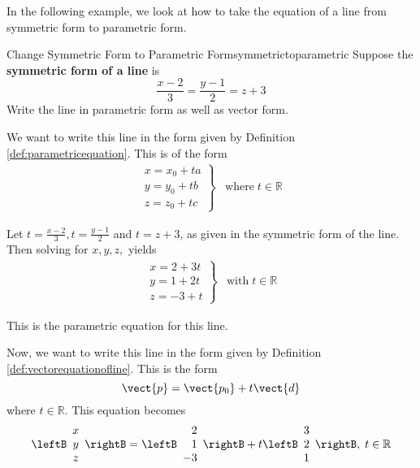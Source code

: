 In the following example, we look at how to take the equation of a line from symmetric form to 
parametric form.

\begin{example}{Change Symmetric Form to Parametric Form}{symmetrictoparametric}
Suppose the
\textbf{symmetric form of a line} is
\begin{equation*}
\frac{x-2}{3}=\frac{y-1}{2}=z+3
\end{equation*}
Write the line in parametric form as well as vector form.
\end{example}

\begin{solution}
We want to write this line in the form given by Definition \ref{def:parametricequation}. This is of the form 
\begin{equation*}
\begin{array}{ll}
\left.
\begin{array}{c}
x = x_0 + ta \\
y = y_0 + tb \\
z = z_0 + tc
\end{array}
\right\} & 
\mbox{where} \; t\in \mathbb{R} 
\end{array}
\end{equation*}

Let $t=\frac{x-2}{3},t=\frac{y-1}{2}$ and $t=z+3$, as given in the symmetric form of the line.
 Then solving for $x,y,z,$
yields
\begin{equation*}
\begin{array}{ll}
\left.
\begin{array}{c}
x=2 + 3t \\
y=1 + 2t \\
z=-3 + t 
\end{array}
\right\} & 
\mbox{with} \;t\in \mathbb{R}
\end{array}
\end{equation*}

This is the parametric equation for this line. 

Now, we want to write this line in the form given by Definition \ref{def:vectorequationofline}.
This is the form 
\begin{equation*}
\vect{p}=\vect{p_0}+t\vect{d}
\end{equation*}
where $t\in \mathbb{R}$.
This equation becomes
\begin{equation*}
\leftB
\begin{array}{c}
x \\
y \\
z
\end{array}
\rightB =
\leftB
\begin{array}{r}
2 \\
1 \\
-3 
\end{array}
\rightB
+
t
\leftB
\begin{array}{r}
3 \\
2 \\
1 
\end{array}
\rightB,
\;t\in
\mathbb{R}
\end{equation*}
\end{solution}
